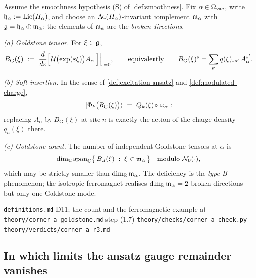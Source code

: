 \begin{definition}
\label{def:goldstone-tensor}
Assume the smoothness hypothesis (S) of \cref{def:smoothness}. Fix
$\alpha \in \Omega_{\mathrm{vac}}$, write $\mathfrak{h}_{\alpha} := \mathrm{Lie}(H_{\alpha})$, and
choose an $\operatorname{Ad}(H_{\alpha})$-invariant complement $\mathfrak{m}_{\alpha}$ with
$\mathfrak{g} = \mathfrak{h}_{\alpha} \oplus \mathfrak{m}_{\alpha}$; the elements of
$\mathfrak{m}_{\alpha}$ are the \emph{broken directions}.

\emph{(a) Goldstone tensor.} For $\xi \in \mathfrak{g}$,
\begin{equation}
  B_{\mathrm{G}}(\xi)
  \; := \; \frac{d}{d\varepsilon}
  \Bigl[\, \mathcal{U}\bigl(\exp(\varepsilon \xi)\bigr) A_{\alpha} \,\Bigr]
  \Big\vert_{\varepsilon = 0},
  \qquad\text{equivalently}\qquad
  B_{\mathrm{G}}(\xi)^{s} = \sum_{s'} q(\xi)_{s s'} \, A_{\alpha}^{s'} .
  \label{eq:goldstone-tensor}
\end{equation}

\emph{(b) Soft insertion.} In the sense of \cref{def:excitation-ansatz} and
\cref{def:modulated-charge},
\begin{equation}
  |\Phi_{k}\bigl(B_{\mathrm{G}}(\xi)\bigr)\rangle \;=\; Q_{k}(\xi) \triangleright \omega_{\alpha} :
\end{equation}
replacing $A_{\alpha}$ by $B_{\mathrm{G}}(\xi)$ at site $n$ is exactly the
action of the charge density $q_{n}(\xi)$ there.

\emph{(c) Goldstone count.} The number of independent Goldstone tensors at
$\alpha$ is
\begin{equation}
  \dim_{\mathbb{C}} \operatorname{span}_{\mathbb{C}}
  \bigl\{\, B_{\mathrm{G}}(\xi) \;:\; \xi \in \mathfrak{m}_{\alpha} \,\bigr\}
  \quad \text{modulo } \mathcal{N}_{0}(\cdot),
\end{equation}
which may be strictly smaller than $\dim_{\mathbb{R}} \mathfrak{m}_{\alpha}$. The deficiency
is the \emph{type-B} phenomenon; the isotropic ferromagnet realises
$\dim_{\mathbb{R}} \mathfrak{m}_{\alpha} = 2$ broken directions but only one Goldstone mode.
\end{definition}

%
{\texttt{definitions.md} D11; the count and the ferromagnetic example at
 \texttt{theory/corner-a-goldstone.md} step (1.7)}%
{\texttt{theory/checks/corner\_a\_check.py}}%
{\texttt{theory/verdicts/corner-a-r3.md}}

\subsection{In which limits the ansatz gauge remainder vanishes}

